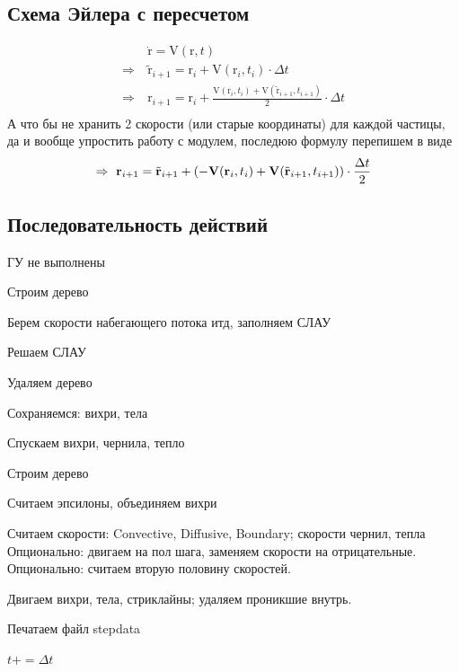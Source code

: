 \documentclass[11pt]{article}
\newcommand{\br}[1]{\boldsymbol{\mathrm{#1}}}
\newenvironment{packed_enum}{
\begin{enumerate}
  \setlength{\itemsep}{1pt}
  \setlength{\parskip}{0pt}
  \setlength{\parsep}{0pt}
}{\end{enumerate}}
\begin{document}
\subsection{Схема Эйлера с пересчетом}
\begin{equation*}\begin{split}
&\dot{\br r} = \br V (\br r, t) \\
\Rightarrow~&\tilde{\br r}_{i+1} = \br r_i + \br V(\br r_i, t_i) \cdot \Delta t \\
\Rightarrow~&\br r_{i+1} = \br r_i + 
\frac{\br V(\br r_i, t_i) + \br V( \tilde{\br r}_{i+1}, t_{i+1})}{2}\cdot \Delta t \\
\end{split}\end{equation*}
А что бы не хранить 2 скорости (или старые координаты) для
каждой частицы, да и вообще упростить работу с модулем,
последюю формулу перепишем в виде
\begin{equation*}
\Rightarrow~\br r_{i+1} = \tilde{\br r}_{i+1} + 
\left( -\br V(\br r_i, t_i) + \br V( \tilde{\br r}_{i+1}, t_{i+1}) \right)\cdot \frac{\Delta t}{2} \\
\end{equation*}

\subsection{Последовательность действий}
\begin{packed_enum}
\item ГУ не выполнены\\
\item Строим дерево
\item Берем скорости набегающего потока итд, заполняем СЛАУ
\item Решаем СЛАУ
\item Удаляем дерево\\
\item Сохраняемся: вихри, тела
\item Спускаем вихри, чернила, тепло\\
\item Строим дерево
\item Считаем эпсилоны, объединяем вихри
\item Считаем скорости: Convective, Diffusive, Boundary; скорости чернил, тепла
\subitem Опционально: двигаем на пол шага, заменяем скорости на отрицательные.
\subitem Опционально: считаем вторую половину скоростей.
\item Двигаем вихри, тела, стриклайны; удаляем проникшие внутрь.
\item Печатаем файл stepdata
\item $t += \Delta t$
\end{packed_enum}
\end{document}
